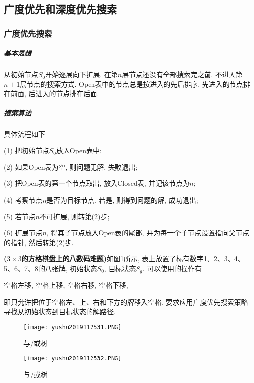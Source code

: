 \subsection{广度优先和深度优先搜索}
\subsubsection{广度优先搜索}
\subparagraph{基本思想}
    从初始节点$S_0$开始逐层向下扩展, 在第$n$层节点还没有全部搜索完之前, 不进入第$n+1$层节点的搜索方式. Open表中的节点总是按进入的先后排序, 先进入的节点排在前面, 后进入的节点排在后面.
\subparagraph{搜索算法} 具体流程如下:

\quad (1) 把初始节点$S_0$放入Open表中;

\quad (2) 如果Open表为空, 则问题无解, 失败退出;

\quad (3) 把Open表的第一个节点取出, 放入Closed表, 并记该节点为$n$;

\quad (4) 考察节点$n$是否为目标节点. 若是, 则得到问题的解, 成功退出;

\quad (5) 若节点$n$不可扩展, 则转第(2)步;

\quad (6) 扩展节点$n$, 将其子节点放入Open表的尾部, 并为每一个子节点设置指向父节点的指针, 然后转第(2)步.
\begin{example}
\textbf{($3\times 3$的方格棋盘上的八数码难题)}\quad 如图\ref{AI32fig2019120231}所示, 表上放置了标有数字1、2、3、4、5、6、7、8的八张牌, 初始状态$S_0$, 目标状态$S_g$. 可以使用的操作有
\begin{center}
    空格左移, 空格上移, 空格右移, 空格下移,
\end{center}
即只允许把位于空格左、上、右和下方的牌移入空格. 要求应用广度优先搜索策略寻找从初始状态到目标状态的解路径.
\end{example}
\begin{figure}[H]
    \vspace{-0.5cm}
    \centering
    \texttt{[image: yushu2019112531.PNG]}
    \caption{与/或树 }
    \label{AI32fig2019120231}
\end{figure}
\begin{figure}[H]
    \centering
    \texttt{[image: yushu2019112532.PNG]}
    \caption{与/或树 }
    \label{AI32fig32}
\end{figure}
